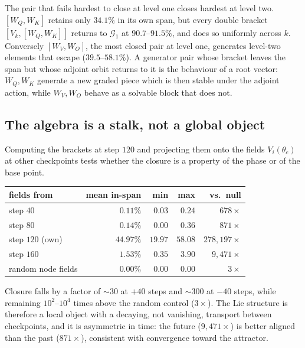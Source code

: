 \begin{observation}
The pair that fails hardest to close at level one closes hardest at level two.
$[W_Q,W_K]$ retains only $34.1\%$ in its own span, but every double bracket
$[V_k,[W_Q,W_K]]$ returns to $\mathcal{G}_1$ at $90.7$--$91.5\%$, and does so
uniformly across $k$. Conversely $[W_V,W_O]$, the most closed pair at level
one, generates level-two elements that escape ($39.5$--$58.1\%$). A generator
pair whose bracket leaves the span but whose adjoint orbit returns to it is the
behaviour of a root vector: $W_Q,W_K$ generate a new graded piece which is then
stable under the adjoint action, while $W_V,W_O$ behave as a solvable block that
does not.
\end{observation}

\subsection{The algebra is a stalk, not a global object}

Computing the brackets at step $120$ and projecting them onto the fields
$V_i(\theta_{c})$ at other checkpoints tests whether the closure is a property
of the phase or of the base point.

\begin{center}
\begin{tabular}{lrrrr}
\toprule
fields from & mean in-span & min & max & vs.\ null \\
\midrule
step $40$          & $0.11\%$  & $0.03$  & $0.24$  & $678\times$ \\
step $80$          & $0.14\%$  & $0.00$  & $0.36$  & $871\times$ \\
step $120$ (own)   & $44.97\%$ & $19.97$ & $58.08$ & $278{,}197\times$ \\
step $160$         & $1.53\%$  & $0.35$  & $3.90$  & $9{,}471\times$ \\
random node fields & $0.00\%$  & $0.00$  & $0.00$  & $3\times$ \\
\bottomrule
\end{tabular}
\end{center}

\begin{proposition}
Closure falls by a factor of $\sim\!30$ at $+40$ steps and $\sim\!300$ at
$-40$ steps, while remaining $10^2$--$10^4$ times above the random control
($3\times$). The Lie structure is therefore a local object with a decaying, not
vanishing, transport between checkpoints, and it is asymmetric in time: the
future ($9{,}471\times$) is better aligned than the past ($871\times$),
consistent with convergence toward the attractor.
\end{proposition}

